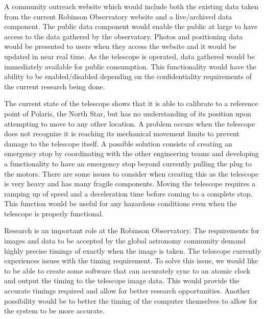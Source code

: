 \documentclass[12pt]{report}
\begin{document}
A community outreach website which would include both the existing data taken from the current Robinson Observatory website and a live/archived data component. The public data component would enable the public at large to have access to the data gathered by the observatory. Photos and positioning data would be presented to users when they access the website and it would be updated in near real time. As the telescope is operated, data gathered would be immediately available for public consumption. This functionality would have the ability to be enabled/disabled depending on the confidentiality requirements of the current research being done.

The current state of the telescope shows that it is able to calibrate to a reference point of Polaris, the North Star, but has no understanding of its position upon attempting to move to any other location.  A problem occurs when the telescope does not recognize it is reaching its mechanical movement limits to prevent damage to the telescope itself.  A possible solution consists of creating an emergency stop by coordinating with the other engineering teams and developing a functionality to have an emergency stop beyond currently pulling the plug to the motors.  There are some issues to consider when creating this as the telescope is very heavy and has many fragile components.  Moving the telescope requires a ramping up of speed and a deceleration time before coming to a complete stop.  This function would be useful for any hazardous conditions even when the telescope is properly functional. 

Research is an important role at the Robinson Observatory.  The requirements for images and data to be accepted by the global astronomy community demand highly precise timings of exactly when the image is taken.  The telescope currently experiences issues with the timing requirement.  To solve this issue, we would like to be able to create some software that can accurately sync to an atomic clock and output the timing to the telescope image data.  This would provide the accurate timings required and allow for better research opportunities.  Another possibility would be to better the timing of the computer themselves to allow for the system to be more accurate.
\end{document}
